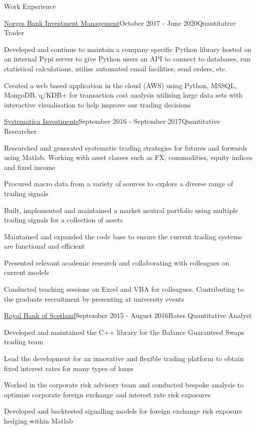 \documentclass{resume} %
\begin{document}
\begin{rSection}{Work Experience}
\begin{rSubsection}{\href{https://www.nbim.no/}{Norges Bank Investment Management}}{October 2017 - June 2020}{Quantitative Trader}{}
	\item Developed and continue to maintain a company specific Python library hosted on an internal Pypi server to give Python users an API to connect to databases, run statistical calculations, utilise automated email facilities, send orders, etc.
	\item Created a web based application in the cloud (AWS) using Python, MSSQL, MongoDB, q/KDB+ for transaction cost analysis utilising large data sets with interactive visualisation to help improve our trading decisions
\end{rSubsection}
\begin{rSubsection}{\href{https://www.systematica.com/}{Systematica Investments}}{September 2016 - September 2017}{Quantitative Researcher}{}
	\item Researched and generated systematic trading strategies for futures and forwards using Matlab. Working with asset classes such as FX, commodities, equity indices and fixed income
	\item Procured macro data from a variety of sources to explore a diverse range of trading signals
	\item Built, implemented and maintained a market neutral portfolio using multiple trading signals for a collection of assets
	\item Maintained and expanded the code base to ensure the current trading systems are functional and efficient
	\item Presented relevant academic research and collaborating with colleagues on current models
	\item Conducted teaching sessions on Excel and VBA for colleagues. Contributing to the graduate recruitment by presenting at university events
\end{rSubsection}
\begin{rSubsection}{\href{https://www.natwestmarkets.com/}{Royal Bank of Scotland}}{September 2015 - August 2016}{Rates Quantitative Analyst}{}
	\item Developed and maintained the C++ library for the Balance Guaranteed Swaps trading team
	\item Lead the development for an innovative and flexible trading platform to obtain fixed interest rates for many types of loans
	\item Worked in the corporate risk advisory team and conducted bespoke analysis to optimize corporate foreign exchange and interest rate risk exposures
	\item Developed and backtested signalling models for foreign exchange risk exposure hedging within Matlab

\end{rSubsection}
\end{rSection}
\end{document}
